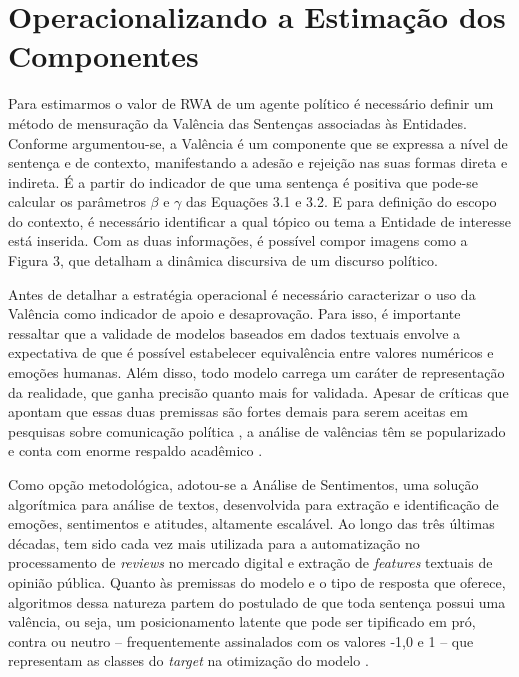 \documentclass[
12pt,				%
openright,			%
twoside,			%
a4paper,			%
english,			%
french,				%
spanish,			%
brazil				%
]{abntex2}
\begin{document}
\section{Operacionalizando a Estimação dos Componentes}

Para estimarmos o valor de RWA de um agente político é necessário definir um método de mensuração da Valência das Sentenças associadas às Entidades. Conforme argumentou-se, a Valência é um componente que se expressa a nível de sentença e de contexto, manifestando a adesão e rejeição nas suas formas direta e indireta. É a partir do indicador de que uma sentença é positiva que pode-se calcular os parâmetros $\beta$ e $\gamma$ das Equações 3.1 e 3.2. E para definição do escopo do contexto, é necessário identificar a qual tópico ou tema a Entidade de interesse está inserida. Com as duas informações, é possível compor imagens como a Figura 3, que detalham a dinâmica discursiva de um discurso político.

Antes de detalhar a estratégia operacional é necessário caracterizar o uso da Valência como indicador de apoio e desaprovação. Para isso, é importante ressaltar que a validade de modelos baseados em dados textuais envolve a expectativa de que é possível estabelecer equivalência entre valores numéricos e emoções humanas. Além disso, todo modelo carrega um caráter de representação da realidade, que ganha precisão quanto mais for validada. Apesar de críticas que apontam que essas duas premissas são fortes demais para serem aceitas em pesquisas sobre comunicação política \cite{miguel2015vale}, a análise de valências têm se popularizado e conta com enorme respaldo acadêmico \cite{feres2016analise}.      

Como opção metodológica, adotou-se a Análise de Sentimentos, uma solução algorítmica para análise de textos, desenvolvida para extração e identificação de emoções, sentimentos e atitudes, altamente escalável. Ao longo das três últimas décadas, tem sido cada vez mais utilizada para a automatização no processamento de \emph{reviews} no mercado digital e extração de \emph{features} textuais de opinião pública. Quanto às premissas do modelo e o tipo de resposta que oferece, algoritmos dessa natureza partem do postulado de que toda sentença possui uma valência, ou seja, um posicionamento latente que pode ser tipificado em pró, contra ou neutro -- frequentemente assinalados com os valores -1,0 e 1 -- que representam as classes do \emph{target} na otimização do modelo \cite{serrano2015sentiment, mantyla2018evolution}.  
\end{document}
